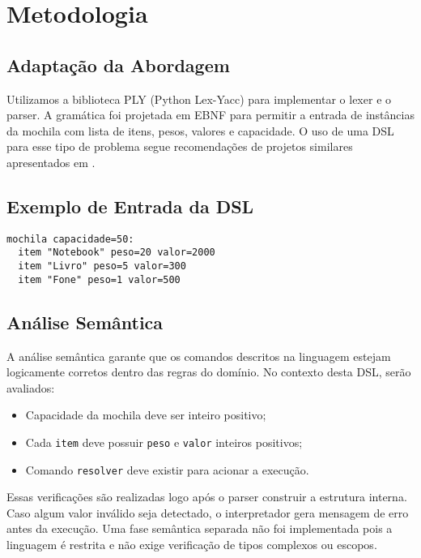 \documentclass[conference]{IEEEtran}
\begin{document}
\section{Metodologia}

\subsection{Adaptação da Abordagem}
Utilizamos a biblioteca PLY (Python Lex-Yacc) para implementar o lexer e o parser. A gramática foi projetada em EBNF para permitir a entrada de instâncias da mochila com lista de itens, pesos, valores e capacidade. O uso de uma DSL para esse tipo de problema segue recomendações de projetos similares apresentados em \cite{mernik2005dsl}.

\subsection{Exemplo de Entrada da DSL}
\begin{lstlisting}
mochila capacidade=50:
  item "Notebook" peso=20 valor=2000
  item "Livro" peso=5 valor=300
  item "Fone" peso=1 valor=500
\end{lstlisting}

\subsection{Análise Semântica}
A análise semântica garante que os comandos descritos na linguagem estejam logicamente corretos dentro das regras do domínio. No contexto desta DSL, serão avaliados:
\begin{itemize}
    \item Capacidade da mochila deve ser inteiro positivo;
    \item Cada \texttt{item} deve possuir \texttt{peso} e \texttt{valor} inteiros positivos;
    \item Comando \texttt{resolver} deve existir para acionar a execução.
\end{itemize}
Essas verificações são realizadas logo após o parser construir a estrutura interna. Caso algum valor inválido seja detectado, o interpretador gera mensagem de erro antes da execução. Uma fase semântica separada não foi implementada pois a linguagem é restrita e não exige verificação de tipos complexos ou escopos.
\end{document}

